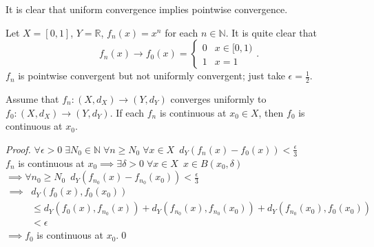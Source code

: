 \documentclass[notoc,notitlepage]{tufte-book}
\begin{document}
\begin{remark}
  It is clear that uniform convergence implies pointwise convergence.
\end{remark}

\begin{eg}
  Let $X = [0, 1]$, $Y = \mathbb{R}$, $f_n(x) = x^n$ for each $n \in \mathbb{N}$. It is quite clear that
  \begin{equation*}
    f_n(x) \to f_0(x) = \begin{cases}
      0 & x \in [0, 1) \\
      1 & x = 1
    \end{cases}.
  \end{equation*}
  $f_n$ is pointwise convergent but not uniformly convergent; just take $\epsilon = \frac{1}{2}$.
\end{eg}

\begin{thm}\label{thm:uniformly_convergent_pointwise_continuous_functions_have_a_pointwise_continuous_limit}
  Assume that $f_n : (X, d_X) \to (Y, d_Y)$ converges uniformly to $f_0 : (X, d_X) \to (Y, d_Y)$. If each $f_n$ is continuous at $x_0 \in X$, then $f_0$ is continuous at $x_0$.
\end{thm}

\begin{proof}
  $\forall \epsilon > 0 \; \exists N_0 \in \mathbb{N} \; \forall n \geq N_0 \; \forall x \in X \enspace d_Y(f_n(x) - f_0(x)) < \frac{\epsilon}{3}$ \\
  \noindent$f_n$ is continuous at $x_0 \implies \exists \delta > 0 \; \forall x \in X \enspace x \in B(x_0, \delta)$ \\
  $\implies \forall n_0 \geq N_0 \enspace d_Y(f_{n_0}(x) - f_{n_0}(x_0)) < \frac{\epsilon}{3}$
  \begin{align*}
    \implies &d_Y \left( f_0(x), f_0(x_0) \right) \\
             &\leq d_Y \left( f_0(x), f_{n_0}(x) \right) + d_Y \left( f_{n_0}(x), f_{n_0}(x_0) \right) + d_Y \left( f_{n_0}(x_0), f_0(x_0) \right) \\
             &< \epsilon
  \end{align*}
  $\implies f_0$ is continuous at $x_0$.\qed\
\end{proof}

\end{document}
